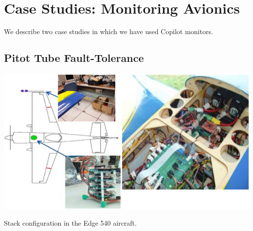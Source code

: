 \section{Case Studies: Monitoring Avionics}
\label{sec:case-study}

We describe two case studies in which we have used Copilot monitors.

\subsection{Pitot Tube Fault-Tolerance}


\begin{myfig}[ht!]
  \centering
  \includegraphics[scale=0.4]{Figs/experiment}
  \caption{Stack configuration in the Edge 540 aircraft.\label{fig:setup}}
\end{myfig}

